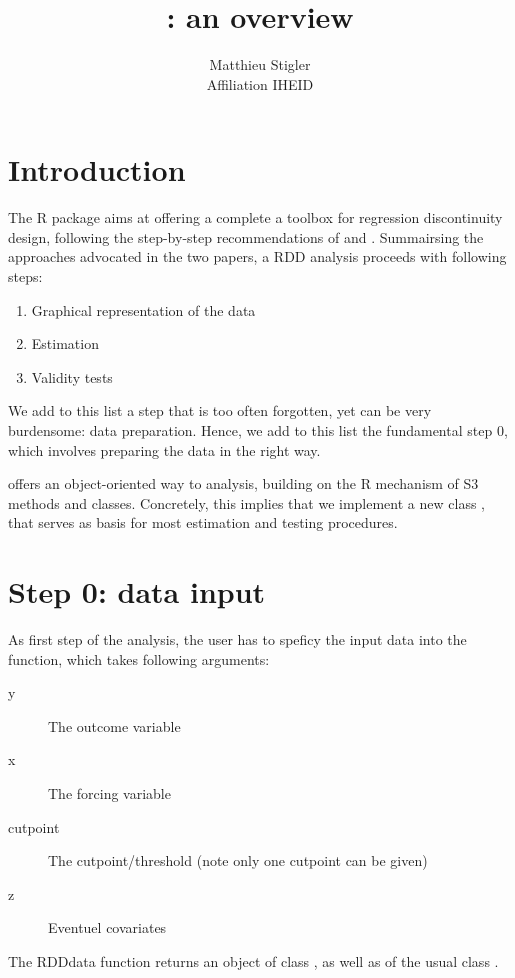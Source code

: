 \documentclass[english,nojss]{jss}\usepackage{graphicx, color}
\author{Matthieu Stigler\\Affiliation IHEID}
\title{\pkg{RDDtools}: an overview }
\begin{document}
\tableofcontents{}


\section{Introduction}


The R package  aims at offering a complete a toolbox
for regression discontinuity design, following the step-by-step recommendations
of \citet{ImbensLemieux2008} and \citet{LeeLemieux2010}. Summairsing
the approaches advocated in the two papers, a RDD analysis proceeds
with following steps:
\begin{enumerate}
\item Graphical representation of the data
\item Estimation 
\item Validity tests
\end{enumerate}
We add to this list a step that is too often forgotten, yet can be
very burdensome: data preparation. Hence, we add to this list the
fundamental step 0, which involves preparing the data in the right
way. 

 offers an object-oriented way to analysis, building
on the R mechanism of S3 methods and classes. Concretely, this implies
that we implement a new class , that serves as basis
for most estimation and testing procedures. 


\section{Step 0: data input}


As first step of the analysis, the user has to speficy the input data
into the  function, which takes following arguments:
\begin{description}
\item [{y}] The outcome variable
\item [{x}] The forcing variable 
\item [{cutpoint}] The cutpoint/threshold (note only one cutpoint can be
given)
\item [{z}] Eventuel covariates
\end{description}
The RDDdata function returns an object of class , as
well as of the usual  class . 
\end{document}
